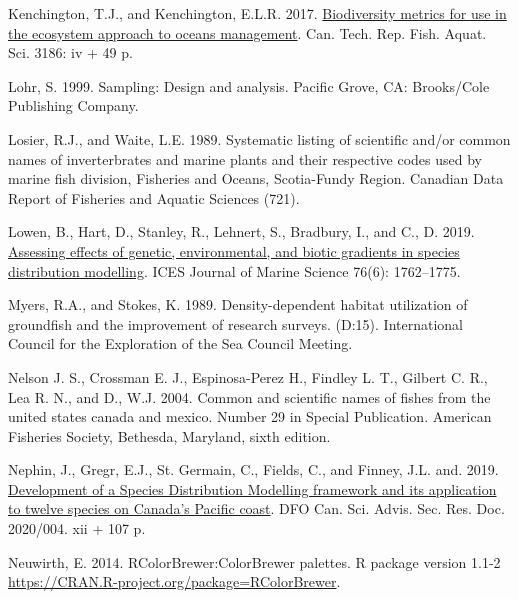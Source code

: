 \documentclass[12pt]{article}\usepackage[]{graphicx}\usepackage[]{color}
\begin{document}
\leavevmode\hypertarget{ref-Kenchingtons2013}{}%
Kenchington, T.J., and Kenchington, E.L.R. 2017. \href{https://www.researchgate.net/profile/Ellen-Kenchington/publication/258296829_Biodiversity_Metrics_for_Use_in_the_Ecosystem_Approach_to_Oceans_Management/links/0c960527bcf2ebf4b8000000/Biodiversity-Metrics-for-Use-in-the-Ecosystem-Approach-to-Oceans-Management.pdf}{Biodiversity metrics for use in the ecosystem approach to oceans management}. Can. Tech. Rep. Fish. Aquat. Sci. 3186: iv + 49 p.

\leavevmode\hypertarget{ref-Lohr1999}{}%
Lohr, S. 1999. Sampling: Design and analysis. Pacific Grove, CA: Brooks/Cole Publishing Company.

\leavevmode\hypertarget{ref-LosierWaite1989}{}%
Losier, R.J., and Waite, L.E. 1989. Systematic listing of scientific and/or common names of inverterbrates and marine plants and their respective codes used by marine fish division, Fisheries and Oceans, Scotia-Fundy Region. Canadian Data Report of Fisheries and Aquatic Sciences (721).

\leavevmode\hypertarget{ref-Lowen:2019}{}%
Lowen, B., Hart, D., Stanley, R., Lehnert, S., Bradbury, I., and C., D. 2019. \href{https://academic.oup.com/icesjms/article/76/6/1762/5430871}{Assessing effects of genetic, environmental, and biotic gradients in species distribution modelling}. ICES Journal of Marine Science 76(6): 1762--1775.

\leavevmode\hypertarget{ref-Myers:Stokes:1989}{}%
Myers, R.A., and Stokes, K. 1989. Density-dependent habitat utilization of groundfish and the improvement of research surveys. (D:15). International Council for the Exploration of the Sea Council Meeting.

\leavevmode\hypertarget{ref-Nelsonetal:2004}{}%
Nelson J. S., Crossman E. J., Espinosa-Perez H., Findley L. T., Gilbert C. R., Lea R. N., and D., W.J. 2004. Common and scientific names of fishes from the united states canada and mexico. Number 29 in Special Publication. American Fisheries Society, Bethesda, Maryland, sixth edition.

\leavevmode\hypertarget{ref-Nephin:2019}{}%
Nephin, J., Gregr, E.J., St. Germain, C., Fields, C., and Finney, J.L. and. 2019. \href{http://publications.gc.ca/collections/collection_2020/mpo-dfo/fs70-5/Fs70-5-2020-004-eng.pdf}{Development of a Species Distribution Modelling framework and its application to twelve species on Canada's Pacific coast}. DFO Can. Sci. Advis. Sec. Res. Doc. 2020/004. xii + 107 p.

\leavevmode\hypertarget{ref-R:package:RColorBrewer}{}%
Neuwirth, E. 2014. RColorBrewer:ColorBrewer palettes. R package version 1.1-2 \url{https://CRAN.R-project.org/package=RColorBrewer}.
\end{document}
